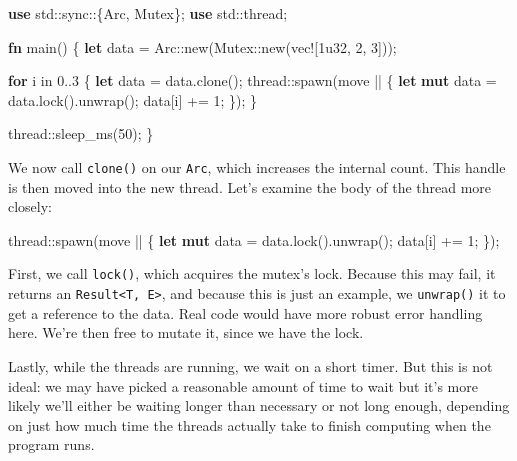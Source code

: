 \documentclass[a4paper,]{book}
\newenvironment{Shaded}{\begin{snugshade}}{\end{snugshade}}
\newcommand{\KeywordTok}[1]{\textcolor[rgb]{0.13,0.29,0.53}{\textbf{{#1}}}}
\newcommand{\DecValTok}[1]{\textcolor[rgb]{0.00,0.00,0.81}{{#1}}}
\newcommand{\OtherTok}[1]{\textcolor[rgb]{0.56,0.35,0.01}{{#1}}}
\newcommand{\NormalTok}[1]{{#1}}
\begin{document}
\begin{Shaded}
\begin{Highlighting}[]
\KeywordTok{use} \NormalTok{std::sync::\{Arc, Mutex\};}
\KeywordTok{use} \NormalTok{std::thread;}

\KeywordTok{fn} \NormalTok{main() \{}
    \KeywordTok{let} \NormalTok{data = Arc::new(Mutex::new(}\OtherTok{vec!}\NormalTok{[}\DecValTok{1u32}\NormalTok{, }\DecValTok{2}\NormalTok{, }\DecValTok{3}\NormalTok{]));}

    \KeywordTok{for} \NormalTok{i in }\DecValTok{0.}\NormalTok{.}\DecValTok{3} \NormalTok{\{}
        \KeywordTok{let} \NormalTok{data = data.clone();}
        \NormalTok{thread::spawn(move || \{}
            \KeywordTok{let} \KeywordTok{mut} \NormalTok{data = data.lock().unwrap();}
            \NormalTok{data[i] += }\DecValTok{1}\NormalTok{;}
        \NormalTok{\});}
    \NormalTok{\}}

    \NormalTok{thread::sleep_ms(}\DecValTok{50}\NormalTok{);}
\NormalTok{\}}
\end{Highlighting}
\end{Shaded}

We now call \texttt{clone()} on our \texttt{Arc}, which increases the
internal count. This handle is then moved into the new thread. Let's
examine the body of the thread more closely:

\begin{Shaded}
\begin{Highlighting}[]
\NormalTok{thread::spawn(move || \{}
    \KeywordTok{let} \KeywordTok{mut} \NormalTok{data = data.lock().unwrap();}
    \NormalTok{data[i] += }\DecValTok{1}\NormalTok{;}
\NormalTok{\});}
\end{Highlighting}
\end{Shaded}

First, we call \texttt{lock()}, which acquires the mutex's lock. Because
this may fail, it returns an
\texttt{Result\textless{}T,\ E\textgreater{}}, and because this is just
an example, we \texttt{unwrap()} it to get a reference to the data. Real
code would have more robust error handling here. We're then free to
mutate it, since we have the lock.

Lastly, while the threads are running, we wait on a short timer. But
this is not ideal: we may have picked a reasonable amount of time to
wait but it's more likely we'll either be waiting longer than necessary
or not long enough, depending on just how much time the threads actually
take to finish computing when the program runs.
\end{document}
